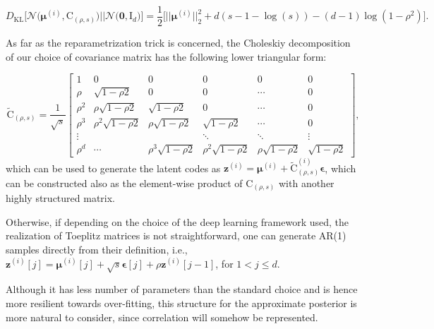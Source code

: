 \documentclass{article}
\begin{document}
\begin{equation} \label{eq:rho_KLD_loss}
D_{\text{KL}}\Big[ \mathcal{N} \Big( \boldsymbol{\mu}^{(i)}, \mathrm{C}_{(\rho,s)} \Big)    \Big|\Big|  \mathcal{N} \big( \mathbf{0}, \mathrm{I}_d \big)  \Big] = \frac{1}{2} \Big[
\big|\big| \boldsymbol{\mu}^{(i)} \big|\big|_2^2 + d(s-1-\log{(s)})  - (d-1)\log{(1 - \rho^2)}  
\Big].
\end{equation}


As far as the reparametrization trick is concerned, the Choleskiy decomposition of our choice of covariance matrix has the following lower triangular form:

\begin{equation}    \label{eq:rho_chol}
\tilde{\mathrm{C}}_{(\rho,s)} = \frac{1}{\sqrt{s}} \begin{bmatrix}
    1          & 0        & 0     & 0       & 0   & 0 \\
    \rho       & \sqrt{1-\rho 2}           & 0       & 0       & \cdots   & 0 \\
    \rho^2     & \rho\sqrt{1-\rho 2}        & \sqrt{1-\rho 2}          & 0         & \cdots   & 0 \\
    \rho^3     & \rho^2\sqrt{1-\rho 2}      & \rho\sqrt{1-\rho 2}       & \sqrt{1-\rho 2}           & \cdots   & 0 \\
    \vdots     &       &       & \ddots       & \ddots   & \vdots      \\
    \rho^{d} & \cdots  & \rho^3 \sqrt{1-\rho 2} & \rho^2 \sqrt{1-\rho 2}   & \rho \sqrt{1-\rho 2}   & \sqrt{1-\rho 2}
  \end{bmatrix},
\end{equation}
which can be used to generate the latent codes as $\mathbf{z}^{(i)} = \boldsymbol{\mu}^{(i)} + \tilde{\mathrm{C}}_{(\rho,s)}^{(i)} \boldsymbol{\epsilon}$, which can be constructed also as the element-wise product of $\mathrm{C}_{(\rho,s)}$ with another highly structured matrix.

Otherwise, if depending on the choice of the deep learning framework used, the realization of Toeplitz matrices is not straightforward, one can generate AR(1) samples directly from their definition, i.e., $\mathbf{z}^{(i)}[j] = \boldsymbol{\mu}^{(i)}[j] + \sqrt{s} \boldsymbol{\epsilon}[j] + \rho \mathbf{z}^{(i)}[j-1]$, for $1 < j \leqslant d$.

Although it has less number of parameters than the standard choice and is hence more resilient towards over-fitting, this structure for the approximate posterior is more natural to consider, since correlation will somehow be represented. 
\end{document}
